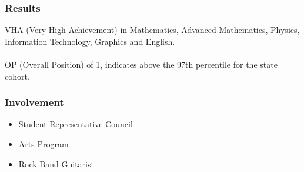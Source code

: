 \subsubsection*{Results}
VHA (Very High Achievement) in Mathematics, Advanced Mathematics, Physics, Information Technology, Graphics and English.\\
\\
OP (Overall Position) of 1, indicates above the 97th percentile for the state cohort.

\subsubsection*{Involvement}

\begin{itemize}
  \item Student Representative Council
  \item Arts Program
  \item Rock Band Guitarist
\end{itemize}

